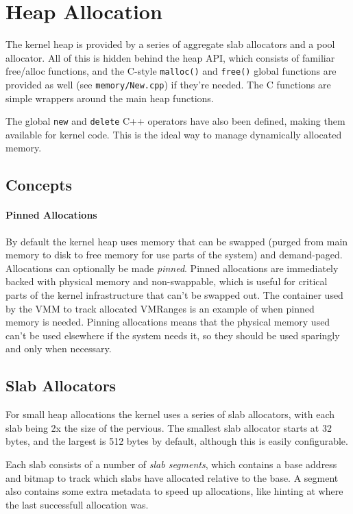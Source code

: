 \section{Heap Allocation}
\label{Heap}
The kernel heap is provided by a series of aggregate slab allocators and a pool allocator. All of this is hidden behind the heap API, which consists of familiar free/alloc functions, and the C-style \verb|malloc()| and \verb|free()| global functions are provided as well (see \verb|memory/New.cpp|) if they're needed. The C functions are simple wrappers around the main heap functions.

The global \verb|new| and \verb|delete| C++ operators have also been defined, making them available for kernel code. This is the ideal way to manage dynamically allocated memory.

\subsection{Concepts}

\paragraph{Pinned Allocations} By default the kernel heap uses memory that can be swapped (purged from main memory to disk to free memory for use parts of the system) and demand-paged. Allocations can optionally be made \textit{pinned}. Pinned allocations are immediately backed with physical memory and non-swappable, which is useful for critical parts of the kernel infrastructure that can't be swapped out. The container used by the VMM to track allocated VMRanges is an example of when pinned memory is needed. Pinning allocations means that the physical memory used can't be used elsewhere if the system needs it, so they should be used sparingly and only when necessary.

\subsection{Slab Allocators}
For small heap allocations the kernel uses a series of slab allocators, with each slab being 2x the size of the pervious. The smallest slab allocator starts at 32 bytes, and the largest is 512 bytes by default, although this is easily configurable. 

Each slab consists of a number of \textit{slab segments}, which contains a base address and bitmap to track which slabs have allocated relative to the base. A segment also contains some extra metadata to speed up allocations, like hinting at where the last successfull allocation was.

